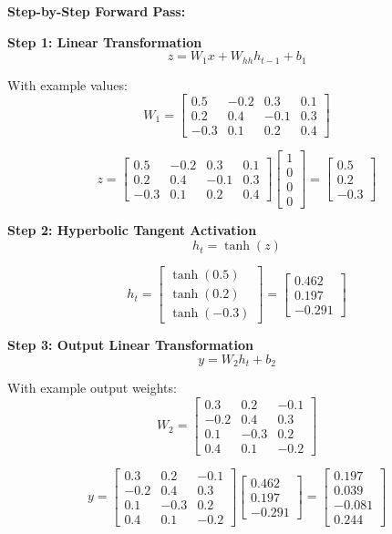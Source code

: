 \documentclass[12pt]{article}
\begin{document}
\begin{enumerate}[(a)]
{    \textbf{Step-by-Step Forward Pass:}
    
    \textbf{Step 1: Linear Transformation}
    $$z = W_1 x + W_{hh} h_{t-1} + b_1$$
    
    With example values:
    $$W_1 = \begin{bmatrix} 0.5 & -0.2 & 0.3 & 0.1 \\ 0.2 & 0.4 & -0.1 & 0.3 \\ -0.3 & 0.1 & 0.2 & 0.4 \end{bmatrix}$$
    
    $$z = \begin{bmatrix} 0.5 & -0.2 & 0.3 & 0.1 \\ 0.2 & 0.4 & -0.1 & 0.3 \\ -0.3 & 0.1 & 0.2 & 0.4 \end{bmatrix} \begin{bmatrix} 1 \\ 0 \\ 0 \\ 0 \end{bmatrix} = \begin{bmatrix} 0.5 \\ 0.2 \\ -0.3 \end{bmatrix}$$
    
    \textbf{Step 2: Hyperbolic Tangent Activation}
    $$h_t = \tanh(z)$$
    
    $$h_t = \begin{bmatrix} \tanh(0.5) \\ \tanh(0.2) \\ \tanh(-0.3) \end{bmatrix} = \begin{bmatrix} 0.462 \\ 0.197 \\ -0.291 \end{bmatrix}$$
    
    \textbf{Step 3: Output Linear Transformation}
    $$y = W_2 h_t + b_2$$
    
    With example output weights:
    $$W_2 = \begin{bmatrix} 0.3 & 0.2 & -0.1 \\ -0.2 & 0.4 & 0.3 \\ 0.1 & -0.3 & 0.2 \\ 0.4 & 0.1 & -0.2 \end{bmatrix}$$
    
    $$y = \begin{bmatrix} 0.3 & 0.2 & -0.1 \\ -0.2 & 0.4 & 0.3 \\ 0.1 & -0.3 & 0.2 \\ 0.4 & 0.1 & -0.2 \end{bmatrix} \begin{bmatrix} 0.462 \\ 0.197 \\ -0.291 \end{bmatrix} = \begin{bmatrix} 0.197 \\ 0.039 \\ -0.081 \\ 0.244 \end{bmatrix}$$
    
}
\end{enumerate}
\end{document}
